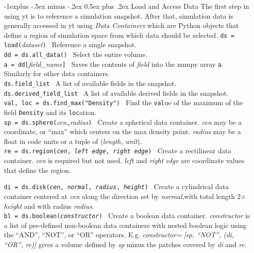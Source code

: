 \documentclass[10pt,landscape]{article}
\makeatletter
\renewcommand{\subsection}{\@startsection{subsection}{2}{0mm}%
                                {-1explus -.5ex minus -.2ex}%
                                {0.5ex plus .2ex}%
                                {\normalfont\normalsize\bfseries}}
\makeatother
\begin{document}
\begin{multicols}{3}
\subsection{Load and Access Data}
The first step in using yt is to reference a simulation snapshot.
After that, simulation data is generally accessed in yt using {\it Data Containers} which are Python objects
that define a region of simulation space from which data should be selected.
\texttt{ds = load(}{\it dataset}\texttt{)} \textemdash\   Reference a single snapshot.\\
\texttt{dd = ds.all\_data()} \textemdash\ Select the entire volume.\\
\texttt{a = dd[}{\it field\_name}\texttt{]} \textemdash\ Saves the contents of {\it field} into the
numpy array \texttt{a}. Similarly for other data containers.\\
\texttt{ds.field\_list} \textemdash\ A list of available fields in the snapshot. \\
\texttt{ds.derived\_field\_list} \textemdash\ A list of available derived fields
in the snapshot. \\
\texttt{val, loc = ds.find\_max("Density")} \textemdash\ Find the \texttt{val}ue of
the maximum of the field \texttt{Density} and its \texttt{loc}ation. \\
\texttt{sp = ds.sphere(}{\it cen}\texttt{,}{\it radius}\texttt{)} \textemdash\   Create a spherical data 
container. {\it cen} may be a coordinate, or ``max'' which 
centers on the max density point. {\it radius} may be a float in 
code units or a tuple of ({\it length, unit}).\\

\texttt{re = ds.region({\it cen}, {\it left edge}, {\it right edge})} \textemdash\ Create a
rectilinear data container. {\it cen} is required but not used.
{\it left} and {\it right edge} are coordinate values that define the region.

\texttt{di = ds.disk({\it cen}, {\it normal}, {\it radius}, {\it height})} \textemdash\ 
Create a cylindrical data container centered at {\it cen} along the 
direction set by {\it normal},with total length
 2$\times${\it height} and with radius {\it radius}. \\
 
 \texttt{bl = ds.boolean({\it constructor})} \textemdash\ Create a boolean data
 container. {\it constructor} is a list of pre-defined non-boolean 
 data containers with nested boolean logic using the
 ``AND'', ``NOT'', or ``OR'' operators. E.g. {\it constructor=}
 {\it [sp, ``NOT'', (di, ``OR'', re)]} gives a volume defined
 by {\it sp} minus the patches covered by {\it di} and {\it re}.\\
 

\end{multicols}
\end{document}
